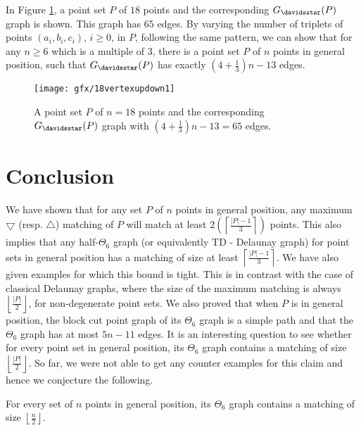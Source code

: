 In Figure \ref{figupdown18ver}, a point set $P$ of $18$ points and the corresponding $G_{\davidsstar}(P)$ graph is shown. 
This graph has $65$ edges. 
By varying the number of triplets of points $(a_i, b_i, c_i)$, $i \ge 0$, in $P$, following the same pattern, we can show that for 
any $n\ge 6$ which is a multiple of $3$, there is a point set $P$ of $n$ points in general position, such that $G_{\davidsstar}(P)$ 
has exactly $\left(4+\frac{1}{3}\right)n-13$ edges.  
\begin{figure}[h]
  \centering
  \texttt{[image: gfx/18vertexupdown1]}   %
  \caption[Tight example for $G_{\davidsstar}(P)$]{A point set $P$ of $n=18$ points and the corresponding $G_{\davidsstar}(P)$ graph with $\left(4+\frac{1}{3}\right)n-13=65$ edges.}
\label{figupdown18ver}
\end{figure} 
\section{Conclusion}
We have shown that for any set $P$ of $n$ points in general position, any maximum $\bigtriangledown$ (resp. $\bigtriangleup$) matching of $P$ will 
match at least $2\left(\left\lceil\frac{|P|-1}{3} \right\rceil\right)$ points. This also implies that any half-$\Theta_6$ graph (or equivalently TD - Delaunay graph) 
for point sets in general position has a matching of size at least $\left\lceil\frac{|P|-1}{3} \right\rceil$. We have also given examples for which this bound is tight. 
This is in contrast with the case of classical Delaunay graphs, where the size of the maximum matching is always $\left\lfloor\frac{|P|}{2} \right\rfloor$, for 
non-degenerate point sets.
We also proved that when $P$ is in general position, the block cut point graph of its $\Theta_6$ graph is a simple path and that the $\Theta_6$ graph has 
at most $5n-11$ edges. It is an interesting question to see whether for every point set in general position, its $\Theta_6$ graph contains a matching of 
size $\left\lfloor \frac{|P|}{2} \right\rfloor$. So far, we were not able to get any counter examples for this claim and hence we conjecture the following.
\begin{conjecture}
 For every set of $n$ points in general position, its $\Theta_6$ graph contains a matching of size $\left\lfloor \frac{n}{2} \right\rfloor$.
\end{conjecture}


